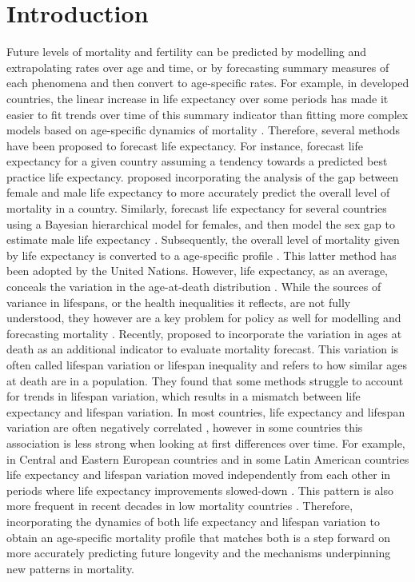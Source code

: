 \documentclass[a4paper,twoside, openright, 12pt, leqno]{article}
\begin{document}
\section{Introduction}
Future levels of mortality and fertility can be predicted by modelling and extrapolating rates over age and time, or by forecasting summary measures of each phenomena and then convert to age-specific rates. For example, in developed countries, the linear increase in life expectancy over some periods has made it easier to fit trends over time of this summary indicator than fitting more complex models based on age-specific dynamics of mortality \citep{White200259}. Therefore, several methods have been proposed to forecast life expectancy. For instance, \citet{torri2012forecasting} forecast life expectancy for a given country assuming a tendency towards a predicted best practice life expectancy. \citet{pascariu2018double} proposed incorporating the analysis of the gap between female and male life expectancy to more accurately predict the overall level of mortality in a country. Similarly, \citet{Raftery2013} forecast life expectancy for several countries using a Bayesian hierarchical model for females, and then model the sex gap to estimate male life expectancy \citep{raftery2014joint}. Subsequently, the overall level of mortality given by life expectancy is converted to a age-specific profile \citep{vsevvcikova2016age}. This latter method has been adopted by the United Nations. However, life expectancy, as an average, conceals the variation in the age-at-death distribution \citep{van2018case}. While the sources of variance in lifespans, or the health inequalities it reflects, are not fully understood, they however are a key problem for policy as well for modelling and forecasting mortality \citep{tuljapurkar2011variance}. Recently, \citet{bohk2017lifespan} proposed to incorporate the variation in ages at death as an additional indicator to evaluate mortality forecast. This variation is often called lifespan variation or lifespan inequality and refers to how similar ages at death are in a population.
They found that some methods struggle to account for trends in lifespan variation, which results in a mismatch between life expectancy and lifespan variation. In most countries, life expectancy and lifespan variation are often negatively correlated \citep{Smits2009,Vaupel2011,colchero2016emergence, alvarez2019latin, gonzaga2018compression}, however in some countries this association is less strong when looking at first differences over time. For example, in Central and Eastern European countries and in some Latin American countries life expectancy and lifespan variation moved independently from each other in periods where life expectancy improvements slowed-down \citep{Aburto2018Eastern,aburto2019upsurge,garcia2019impact}. This pattern is also more frequent in recent decades in low mortality countries \citep{aburtoDynamics2019}. Therefore, incorporating the dynamics of both life expectancy and lifespan variation to obtain an age-specific mortality profile that matches both is a step forward on more accurately predicting future longevity and the mechanisms underpinning new patterns in mortality.
\end{document}
